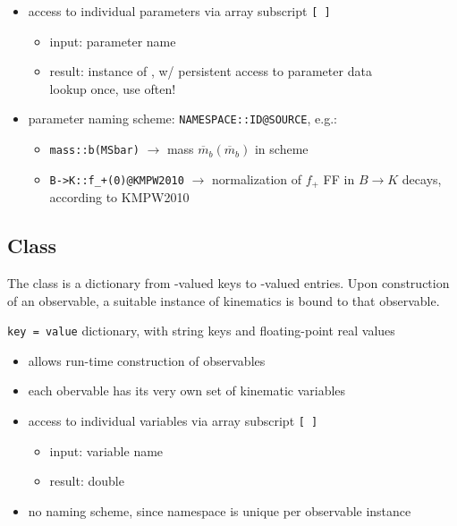 \begin{itemize}
    \item access to individual parameters via array subscript \texttt{[\,]}
    \begin{itemize}
        \item input: parameter name
        \item result: instance of ,
            w/ persistent access to parameter data\\
            {lookup once, use often!}
    \end{itemize}
    \item parameter naming scheme: \texttt{NAMESPACE::ID@SOURCE}, e.g.:\\
    \begin{itemize}
        \item \texttt{mass::b(MSbar)} $\to$ mass $\overline{m}_b(\overline{m}_b)$ in \MSbar{} scheme
        \item \texttt{B->K::f\_+(0)@KMPW2010} $\to$ normalization of $f_+$ FF in $B\to K$ decays, according to KMPW2010
    \end{itemize}
\end{itemize}

\subsection{Class }

The class  is a dictionary from -valued keys to
-valued entries. Upon construction of an observable, a suitable instance
of kinematics is bound to that observable.

\texttt{key = value} dictionary, with string keys and floating-point real values

\begin{itemize}
    \item allows run-time construction of observables
    \item each obervable has its very own set of kinematic variables
    \item access to individual variables via array subscript {\texttt{[\,]}}
    \begin{itemize}
        \item input: variable name
        \item result: double
    \end{itemize}
    \item no naming scheme, since namespace is unique per observable instance
\end{itemize}

